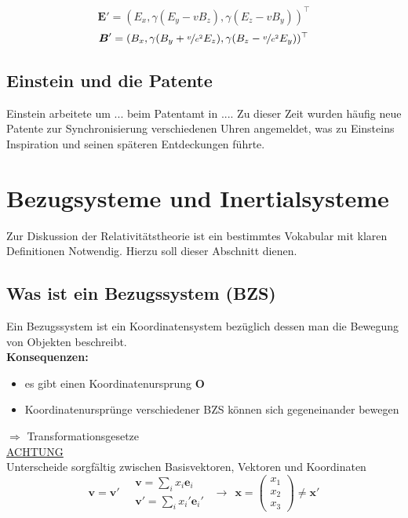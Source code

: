\documentclass[titlepage,11pt,a4paper,ngerman]{report}
\renewcommand{\vec}[1]{\boldsymbol{#1}}
\begin{document}
$$\vec{E}'=(E_x,\gamma(E_y-vB_z),\gamma(E_z-vB_y))^\top$$
$$\vec{B}'=(B_x,\gamma(B_y+\nicefrac{v}{c^2}E_z),\gamma(B_z-\nicefrac{v}{c^2}E_y))^\top$$

\subsection{Einstein und die Patente}


Einstein arbeitete um ... beim Patentamt in .... Zu dieser Zeit wurden häufig neue Patente zur Synchronisierung verschiedenen Uhren angemeldet, was zu Einsteins Inspiration und seinen späteren Entdeckungen führte.

\section{Bezugsysteme und Inertialsysteme}
Zur Diskussion der Relativitätstheorie ist ein bestimmtes Vokabular mit klaren Definitionen Notwendig. Hierzu soll dieser Abschnitt dienen.

\subsection{Was ist ein Bezugssystem (BZS)}

Ein Bezugssystem ist ein Koordinatensystem bezüglich dessen man die Bewegung von Objekten beschreibt.\\
\textbf{Konsequenzen:}
\begin{itemize}
	\item es gibt einen Koordinatenursprung $ \vec{O} $
	\item Koordinatenursprünge verschiedener BZS können sich gegeneinander bewegen
\end{itemize}
$ \Rightarrow $ Transformationsgesetze\\[5pt]
\underline{ACHTUNG}\\
Unterscheide sorgfältig zwischen Basisvektoren, Vektoren und Koordinaten
\begin{equation*}
\vec{v} = \vec{v}' \quad \begin{array}{c}
\vec{v} = \sum_i x_i \vec{e}_i \\ \vec{v}' = \sum_i x_i' \vec{e}_i'
\end{array} \ \ \rightarrow \ \ \vec{x} = \begin{pmatrix}
x_1 \\ x_2 \\ x_3
\end{pmatrix} \neq \vec{x}'
\end{equation*}
\end{document}
